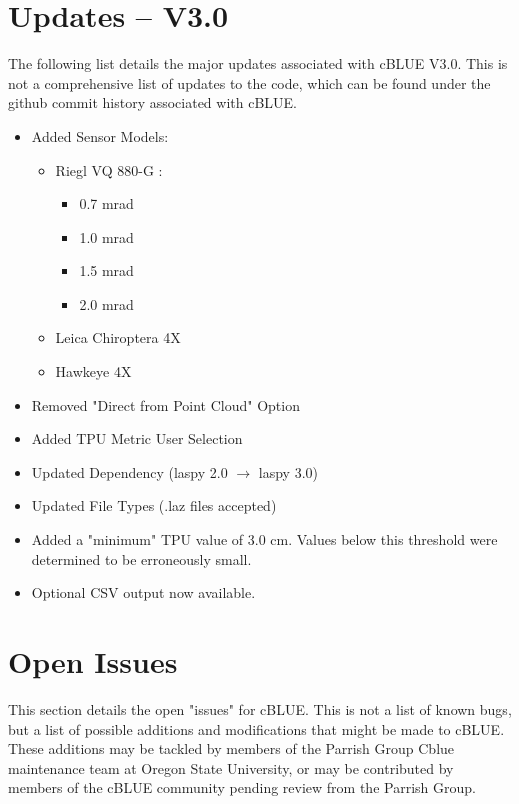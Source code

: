 \documentclass[11pt, a4paper]{article}
\begin{document}
\section{Updates -- V3.0}       
\label{sec:updates}    
\vspace{-.1cm}
The following list details the major updates associated with cBLUE V3.0. This is not a comprehensive list of updates to the code, which can be found under the github commit history associated with cBLUE.
\begin{itemize}
    \item Added Sensor Models:
    \begin{itemize}
        \item Riegl VQ 880-G :
        \begin{itemize}
            \item 0.7 mrad
            \item 1.0 mrad
            \item 1.5 mrad
            \item 2.0 mrad
        \end{itemize}
        \item Leica Chiroptera 4X
        \item Hawkeye 4X
    \end{itemize}
    \item Removed "Direct from Point Cloud" Option
    \item Added TPU Metric User Selection
    \item Updated Dependency (laspy 2.0 $\rightarrow$ laspy 3.0)
    \item Updated File Types (.laz files accepted)
    \item Added a "minimum" TPU value of 3.0 cm. Values below this threshold were determined to be erroneously small.
    \item Optional CSV output now available.
\end{itemize}

\section{Open Issues}       
\label{sec:issues}   
\vspace{-.1cm}
This section details the open "issues" for cBLUE. This is not a list of known bugs, but a list of possible additions and modifications that might be made to cBLUE. These additions may be tackled by members of the Parrish Group Cblue maintenance team at Oregon State University, or may be contributed by members of the cBLUE community pending review from the Parrish Group.
\end{document}
